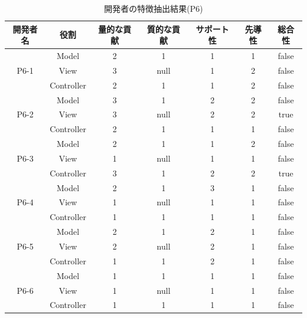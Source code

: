 \documentclass{funthesis}
\begin{document}
\begin{table}[htb]
  \begin{center}
\begin{tabular}{|c|c|c|c|c|c|c|}
\hline
開発者名 & 役割 & 量的な貢献 & 質的な貢献 & サポート性 & 先導性 & 総合性\\ \hline
& Model & 2 & 1 & 1 & 1 & false\\ \cline{2-7}
P6-1 & View & 3 & null & 1 & 2 & false\\ \cline{2-7}
& Controller & 2 & 1 & 1 & 2 & false \\ \hline \hline
& Model & 3 & 1 & 2 & 2 & false\\ \cline{2-7}
P6-2 & View & 3 & null & 2 & 2 & true\\ \cline{2-7}
& Controller & 2 & 1 & 1 & 1 & false \\ \hline \hline
& Model & 2 & 1 & 1 & 2 & false\\ \cline{2-7}
P6-3 & View & 1 & null & 1 & 1 & false\\ \cline{2-7}
& Controller & 3 & 1 & 2 & 2 & true \\ \hline \hline
& Model & 2 & 1 & 3 & 1 & false\\ \cline{2-7}
P6-4 & View & 1 & null& 1 & 1 & false\\ \cline{2-7}
& Controller & 1 & 1 & 1 & 1 & false \\ \hline \hline
& Model & 2 & 1 & 2 & 1 & false\\ \cline{2-7}
P6-5 & View & 2 & null& 2 & 1 & false\\ \cline{2-7}
& Controller & 1 & 1 & 2 & 1 & false \\ \hline \hline
& Model & 1 & 1 & 1 & 1 & false\\ \cline{2-7}
P6-6 & View & 1 & null & 1 & 1 & false\\ \cline{2-7}
& Controller & 1 & 1 & 1 & 1 & false \\ \hline
\end{tabular}
  \end{center}
  \caption{開発者の特徴抽出結果(P6)}    \label{sample}
\end{table}
\end{document}
